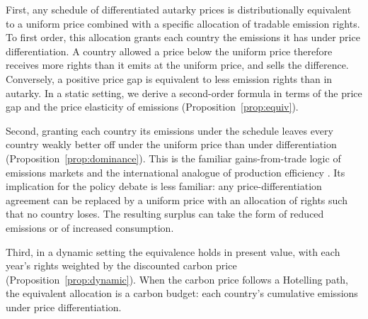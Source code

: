 \documentclass[12pt,english]{article}
\theoremstyle{remark}
\begin{document}
First, any schedule of differentiated autarky prices is distributionally equivalent to a uniform price combined with a specific allocation of tradable emission rights. To first order, this allocation grants each country the emissions it has under price differentiation. A country allowed a price below the uniform price therefore receives more rights than it emits at the uniform price, and sells the difference. %
Conversely, a positive price gap is equivalent to less emission rights than in autarky.
In a static setting, we derive %
a second-order formula in terms of the price gap and the price elasticity of emissions (Proposition~\ref{prop:equiv}).


Second, granting each country its emissions under the schedule leaves every country weakly better off under the uniform price than under differentiation (Proposition~\ref{prop:dominance}). This is the familiar gains-from-trade logic of emissions markets \citep{montgomery_markets_1972} and the international analogue of production efficiency \citep{diamond_optimal_1971}. Its implication for the policy debate is less familiar: any price-differentiation agreement can be replaced by a uniform price with an allocation of rights such that no country loses. The resulting surplus can take the form of reduced emissions or of increased consumption.

Third, in a dynamic setting the equivalence holds in present value, with each year's rights weighted by the discounted carbon price (Proposition~\ref{prop:dynamic}). When the carbon price follows a Hotelling path, the equivalent allocation is a carbon budget: each country's cumulative emissions under price differentiation.
\end{document}

